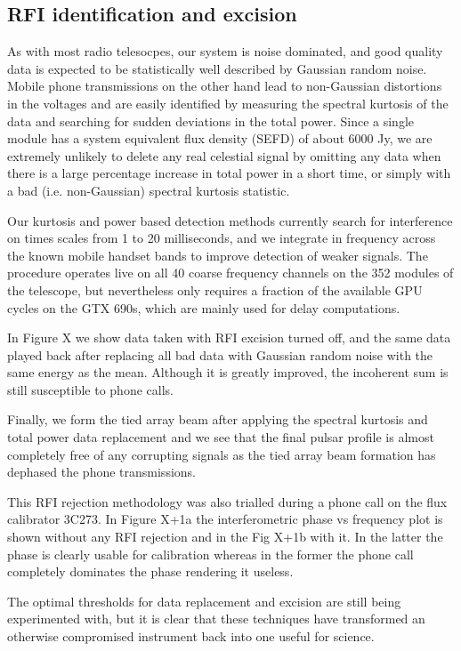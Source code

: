 \subsection{RFI identification and excision}

As with most radio telesocpes, our system is noise dominated, and good quality data is expected to be statistically well described by Gaussian random noise. Mobile phone transmissions on the other hand lead to non-Gaussian distortions in the voltages and are easily identified by measuring the spectral kurtosis of the data and searching for sudden deviations in the total power. Since a single module has a system equivalent flux density (SEFD) of about 6000 Jy, we are extremely unlikely to delete any real celestial signal by omitting any data when there is a large percentage increase in total power in a short time, or simply with a bad (i.e. non-Gaussian) spectral kurtosis statistic. 

Our kurtosis and power based detection methods currently search for interference on times scales from 1 to 20 milliseconds, and we integrate in frequency across the known mobile handset bands to improve detection of weaker signals. The procedure operates live on all 40 coarse frequency channels on the 352 modules of the telescope, but nevertheless only requires a fraction of the available GPU cycles on the GTX 690s, which are mainly used for delay computations. 

In Figure X we show data taken with RFI excision turned off, and the same data played back after replacing all bad data with Gaussian random noise with the same energy as the mean. Although it is greatly improved, the incoherent sum is still susceptible to phone calls.

Finally, we form the tied array beam after applying the spectral kurtosis and total power data replacement and we see that the final pulsar profile is almost completely free of any corrupting signals as the tied array beam formation has dephased the phone transmissions.

This RFI rejection methodology was also trialled during a phone call on the flux calibrator 3C273. In Figure X+1a the interferometric phase vs frequency plot is shown without any RFI rejection and in the Fig X+1b with it. In the latter the phase is clearly usable for calibration whereas in the former the phone call completely dominates the phase rendering it useless.

The optimal thresholds for data replacement and excision are still being experimented with, but it is clear that these techniques have transformed an otherwise compromised instrument back into one useful for science.


  